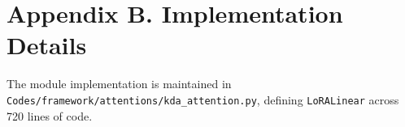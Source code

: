 \section*{Appendix B. Implementation Details}
The module implementation is maintained in \texttt{Codes/framework/attentions/kda\_attention.py}, defining \texttt{LoRALinear} across 720 lines of code.
